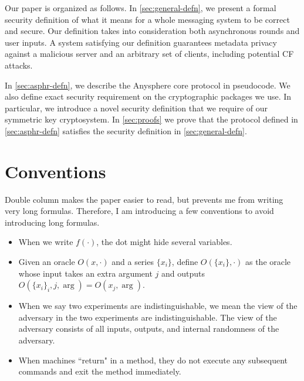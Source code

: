 Our paper is organized as follows. In \cref{sec:general-defn}, we present a formal security definition of what it means for a whole messaging system to be correct and secure. Our definition takes into consideration both asynchronous rounds and user inputs. A system satisfying our definition guarantees metadata privacy against a malicious server and an arbitrary set of clients, including potential CF attacks.

In \cref{sec:asphr-defn}, we describe the Anysphere core protocol in pseudocode. We also define exact security requirement on the cryptographic packages we use. In particular, we introduce a novel security definition that we require of our symmetric key cryptosystem. In \cref{sec:proofs} we prove that the protocol defined in \cref{sec:asphr-defn} satisfies the security definition in \cref{sec:general-defn}.



\section{Conventions}
Double column makes the paper easier to read, but prevents me from writing very long formulas. Therefore, I am introducing a few conventions to avoid introducing long formulas.
\begin{itemize}
    \item When we write $f(\cdot)$, the dot might hide several variables.
    
    \item Given an oracle $O(x, \cdot)$ and a series $\{x_i\}$, define $O(\{x_i\}, \cdot)$ as the oracle whose input takes an extra argument $j$ and outputs $O(\{x_i\}_i, j, \arg) = O(x_j, \arg)$.

    \item When we say two experiments are indistinguishable, we mean the view of the adversary in the two experiments are indistinguishable. The view of the adversary consists of all inputs, outputs, and internal randomness of the adversary.
    
    \item When machines ``return" in a method, they do not execute any subsequent commands and exit the method immediately.
\end{itemize}

